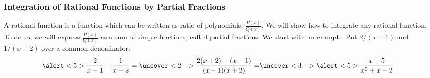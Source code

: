\begin{frame}
\frametitle{Integration of Rational Functions by Partial Fractions}
A rational function is a function which can be written as ratio of polynomials, $\frac{P(x)}{Q(x)}$. We will show how to integrate any rational function. To do so, we will express $\frac{P(x)}{Q(x)}$ as a sum of simple fractions, called partial fractions. We start with an example. Put $2/(x-1)$ and $1/(x+2)$ over a common denominator:
\[
\alert<5>{\frac{2}{x-1} - \frac{1}{x+2} } = %
\uncover<2->{%
\frac{2(x+2) - (x-1)}{(x-1)(x+2)} = %
}%
\uncover<3->{%
\alert<5>{ \frac{x + 5}{x^2+x-2} }%
}%
\]

%

\end{frame}
